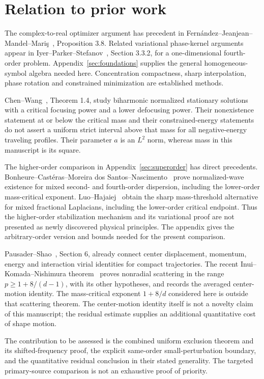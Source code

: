 \documentclass[11pt,a4paper]{article}
\theoremstyle{remark}\newtheorem{remark}[theorem]{Remark}
\begin{document}
\section{Relation to prior work}
The complex-to-real optimizer argument has precedent in Fern\'andez--Jeanjean--Mandel--Mari\c{s}~\cite{FJMM}, Proposition 3.8. Related variational phase-kernel arguments appear in Iyer--Parker--Stefanov~\cite{IPS}, Section 3.3.2, for a one-dimensional fourth-order problem. Appendix~\ref{sec:foundations} supplies the general homogeneous-symbol algebra needed here. Concentration compactness, sharp interpolation, phase rotation and constrained minimization are established methods.

Chen--Wang~\cite{CW}, Theorem 1.4, study biharmonic normalized stationary solutions with a critical focusing power and a lower defocusing power. Their nonexistence statement at or below the critical mass and their constrained-energy statements do not assert a uniform strict interval above that mass for all negative-energy traveling profiles. Their parameter $a$ is an $L^2$ norm, whereas mass in this manuscript is its square.

The higher-order comparison in Appendix~\ref{sec:superorder} has direct precedents. Bonheure--Cast\'eras--Moreira dos Santos--Nascimento~\cite{BCMN} prove normalized-wave existence for mixed second- and fourth-order dispersion, including the lower-order mass-critical exponent. Luo--Hajaiej~\cite{LH} obtain the sharp mass-threshold alternative for mixed fractional Laplacians, including the lower-order critical endpoint. Thus the higher-order stabilization mechanism and its variational proof are not presented as newly discovered physical principles. The appendix gives the arbitrary-order version and bounds needed for the present comparison.

Pausader--Shao~\cite{PS}, Section 6, already connect center displacement, momentum, energy and interaction virial identities for compact trajectories. The recent Inui--Komada--Nishimura theorem~\cite{IKN} proves nonradial scattering in the range $p\ge1+8/(d-1)$, with its other hypotheses, and records the averaged center-motion identity. The mass-critical exponent $1+8/d$ considered here is outside that scattering theorem. The center-motion identity itself is not a novelty claim of this manuscript; the residual estimate supplies an additional quantitative cost of shape motion.

The contribution to be assessed is the combined uniform exclusion theorem and its shifted-frequency proof, the explicit same-order small-perturbation boundary, and the quantitative residual conclusion in their stated generality. The targeted primary-source comparison is not an exhaustive proof of priority.
\end{document}
